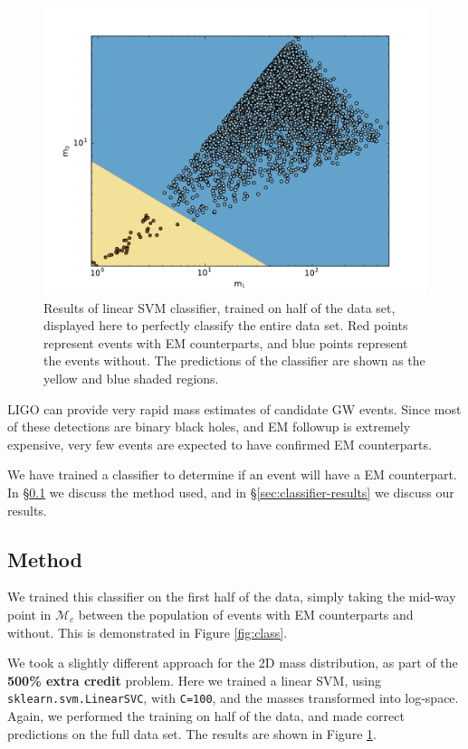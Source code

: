 \begin{figure}[ht]
  \includegraphics[width=\textwidth]{img/classifier-2D.pdf}
  \caption{Results of linear SVM classifier, trained on half of the data set, displayed here to perfectly classify the entire data set. Red points represent events with EM counterparts, and blue points represent the events without. The predictions of the classifier are shown as the yellow and blue shaded regions.}
  \label{fig:2dclass}
\end{figure}



LIGO can provide very rapid mass estimates of candidate GW events. Since most of these detections are binary black holes, and EM followup is extremely expensive, very few events are expected to have confirmed EM counterparts.

We have trained a classifier to determine if an event will have a EM counterpart. In \S\ref{sec:classifier-method} we discuss the method used, and in \S\ref{sec:classifier-results} we discuss our results.


\subsection{Method}
\label{sec:classifier-method}
We trained this classifier on the first half of the data, simply taking the mid-way point in $\mathcal{M}_c$ between the population of events with EM counterparts and without. This is demonstrated in Figure \ref{fig:class}.

We took a slightly different approach for the 2D mass distribution, as part of the \textbf{500\% extra credit} problem. Here we trained a linear SVM, using \texttt{sklearn.svm.LinearSVC}, with \texttt{C=100}, and the masses transformed into log-space. Again, we performed the training on half of the data, and made correct predictions on the full data set. The results are shown in Figure \ref{fig:2dclass}.


